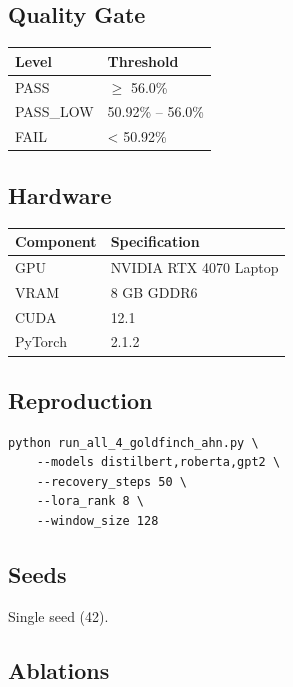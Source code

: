 \subsection{Quality Gate}

\begin{table}[H]
\centering
\small
\begin{tabular}{ll}
\toprule
\textbf{Level} & \textbf{Threshold} \\
\midrule
PASS & $\ge$ 56.0\% \\
PASS\_LOW & 50.92\% -- 56.0\% \\
FAIL & < 50.92\% \\
\bottomrule
\end{tabular}
\end{table}

\subsection{Hardware}

\begin{table}[H]
\centering
\small
\begin{tabular}{ll}
\toprule
\textbf{Component} & \textbf{Specification} \\
\midrule
GPU & NVIDIA RTX 4070 Laptop \\
VRAM & 8 GB GDDR6 \\
CUDA & 12.1 \\
PyTorch & 2.1.2 \\
\bottomrule
\end{tabular}
\end{table}

\subsection{Reproduction}

\begin{lstlisting}
python run_all_4_goldfinch_ahn.py \
    --models distilbert,roberta,gpt2 \
    --recovery_steps 50 \
    --lora_rank 8 \
    --window_size 128
\end{lstlisting}

\subsection{Seeds}

Single seed (42).

\subsection{Ablations}

